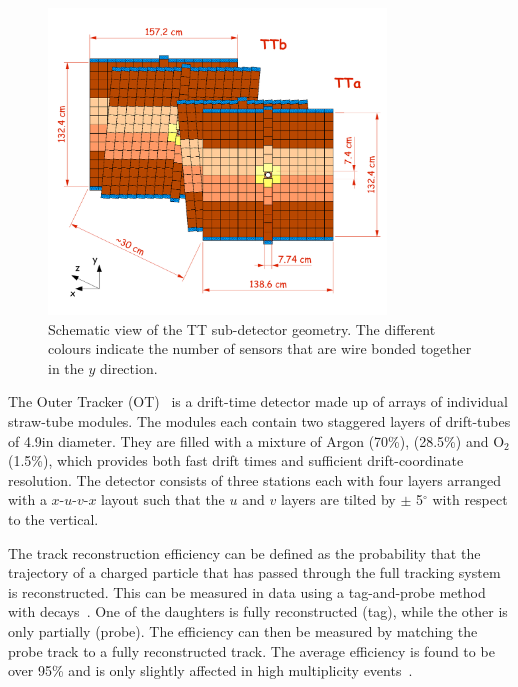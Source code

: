 \begin{figure}[!tb]
\centering
\includegraphics[width=0.8\textwidth]{figs/detector/tt.pdf}
\caption{Schematic view of the TT sub-detector geometry. The different colours indicate the number of sensors that are wire bonded together in the $y$ direction.}
\label{fig:tt}
\end{figure}

The Outer Tracker (OT)~\cite{LHCb-TDR-006,LHCb-DP-2013-003,LHCb-DP-2014-002} is a drift-time detector made up of arrays of individual straw-tube modules. The modules each contain two staggered layers of drift-tubes of 4.9\mm in diameter. They are filled with a mixture of Argon (70\%), \cotwo (28.5\%) and $\mathrm{O}_{2}$ (1.5\%), which provides both fast drift times and sufficient drift-coordinate resolution. The detector consists of three stations each with four layers arranged with a \mbox{$x$-$u$-$v$-$x$} layout such that the $u$ and $v$ layers are tilted by $\pm$ 5$^{\circ}$ with respect to the vertical.

The track reconstruction efficiency can be defined as the probability that the trajectory of a charged particle that has passed through the full tracking system is reconstructed. This can be measured in data using a tag-and-probe method with \decay{\jpsi}{\mumu} decays~\cite{LHCb-DP-2013-002}. One of the daughters is fully reconstructed (tag), while the other is only partially (probe).  The efficiency can then be measured by matching the probe track to a fully reconstructed track. The average efficiency is found to be over 95\% and is only slightly affected in high multiplicity events~\cite{LHCb-DP-2013-002}.

